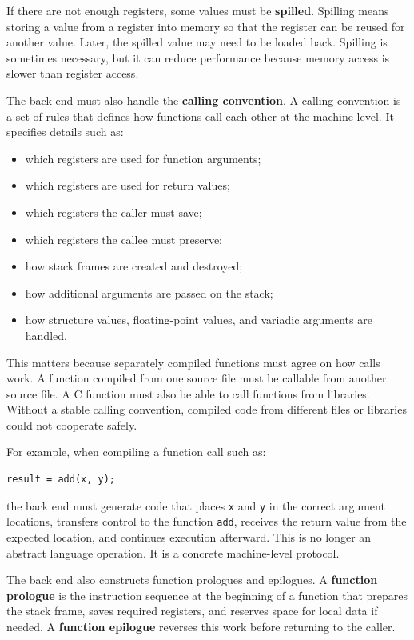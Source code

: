 If there are not enough registers, some values must be \textbf{spilled}. Spilling means storing a value from a register into memory so that the register can be reused for another value. Later, the spilled value may need to be loaded back. Spilling is sometimes necessary, but it can reduce performance because memory access is slower than register access.

The back end must also handle the \textbf{calling convention}. A calling convention is a set of rules that defines how functions call each other at the machine level. It specifies details such as:

\begin{itemize}
    \item which registers are used for function arguments;
    \item which registers are used for return values;
    \item which registers the caller must save;
    \item which registers the callee must preserve;
    \item how stack frames are created and destroyed;
    \item how additional arguments are passed on the stack;
    \item how structure values, floating-point values, and variadic arguments are handled.
\end{itemize}

This matters because separately compiled functions must agree on how calls work. A function compiled from one source file must be callable from another source file. A C function must also be able to call functions from libraries. Without a stable calling convention, compiled code from different files or libraries could not cooperate safely.

For example, when compiling a function call such as:

\begin{verbatim}
result = add(x, y);
\end{verbatim}

the back end must generate code that places \texttt{x} and \texttt{y} in the correct argument locations, transfers control to the function \texttt{add}, receives the return value from the expected location, and continues execution afterward. This is no longer an abstract language operation. It is a concrete machine-level protocol.

The back end also constructs function prologues and epilogues. A \textbf{function prologue} is the instruction sequence at the beginning of a function that prepares the stack frame, saves required registers, and reserves space for local data if needed. A \textbf{function epilogue} reverses this work before returning to the caller.

